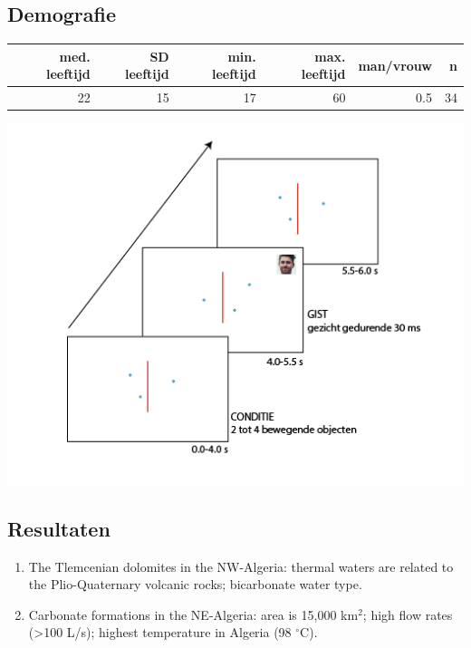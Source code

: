 \documentclass[a0,portrait]{a0poster}
\begin{document}
\begin{multicols}{3}
\subsection*{Demografie}
\begin{tabular}{r r r r r r}
	\hline
	med. leeftijd & SD leeftijd & min. leeftijd & max. leeftijd & man/vrouw & n\\
	\hline
	22 & 15 & 17 & 60 & 0.5 & 34\\
	\hline
\end{tabular}
\begin{center}\vspace{1cm}
\includegraphics[width=1.0\linewidth]{Methode.png}
\end{center}\vspace{1cm}


\subsection*{Resultaten}
\begin{enumerate}
\item The Tlemcenian dolomites in the NW-Algeria: thermal waters are related to the Plio-Quaternary volcanic rocks; bicarbonate water type.
\item Carbonate formations in the NE-Algeria: area is 15,000 km$^2$; high flow rates (\textgreater100 L/s); highest temperature in Algeria (98 $^{\circ}$C). 
\end{enumerate}


\end{multicols}
\end{document}
